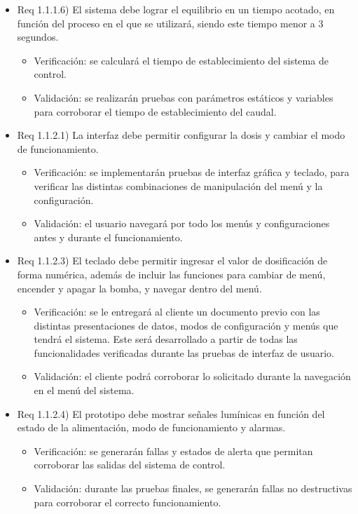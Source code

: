 \documentclass[
11pt, %
]{charter}
\begin{document}
\begin{itemize}
\item Req 1.1.1.6) El sistema debe lograr el equilibrio en un tiempo acotado, en función del proceso en el que se utilizará, siendo este tiempo menor a 3 segundos.

\begin{itemize}
	\item Verificación: se calculará el tiempo de establecimiento del sistema de control.
	\item Validación: se realizarán pruebas con parámetros estáticos y variables para corroborar el tiempo de establecimiento del caudal.
\end{itemize}

\item Req 1.1.2.1) La interfaz debe permitir configurar la dosis y cambiar el modo de funcionamiento.

\begin{itemize}
	\item Verificación: se implementarán pruebas de interfaz gráfica y teclado, para verificar las distintas combinaciones de manipulación del menú y la configuración.
	\item Validación: el usuario navegará por todo los menús y configuraciones antes y durante el funcionamiento.
\end{itemize}

\item Req 1.1.2.3) El teclado debe permitir ingresar el valor de dosificación de forma numérica, además de incluir las funciones para cambiar de menú, encender y apagar la bomba, y navegar dentro del menú.

\begin{itemize}
	\item Verificación: se le entregará al cliente un documento previo con las distintas presentaciones de datos, modos de configuración y menús que tendrá el sistema. Este será desarrollado a partir de todas las funcionalidades verificadas durante las pruebas de interfaz de usuario.
	\item Validación: el cliente podrá corroborar lo solicitado durante la navegación en el menú del sistema.
\end{itemize}

\item Req 1.1.2.4) El prototipo debe mostrar señales lumínicas en función del estado de la alimentación, modo de funcionamiento y alarmas.

\begin{itemize}
	\item Verificación: se generarán fallas y estados de alerta que permitan corroborar las salidas del sistema de control.
	\item Validación: durante las pruebas finales, se generarán fallas no destructivas para corroborar el correcto funcionamiento.
\end{itemize}


\end{itemize}
\end{document}
